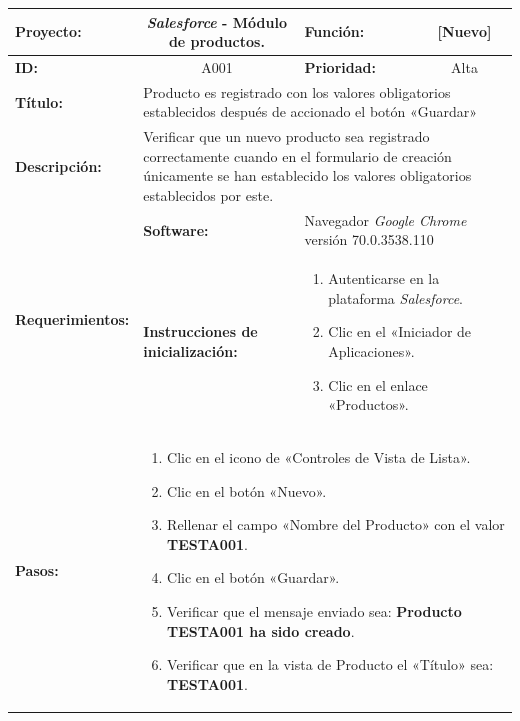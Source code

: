 \begin{table}[H]
\centering
\begin{tabular}{|p{2.5cm}|p{2.8cm}|p{2.2cm}|p{2.8cm}|p{2.2cm}|}
\hline
\footnotesize{\textbf{Proyecto:}} &
\multicolumn{2}{c|}{\footnotesize{\emph{Salesforce} - Módulo de productos.}} &
\footnotesize{\textbf{Función:}} &
\multicolumn{1}{c|}{\footnotesize{[Nuevo]}} \\
\hline
\footnotesize{\textbf{ID:}} & \multicolumn{2}{c|}{\footnotesize{A001}} &
\footnotesize{\textbf{Prioridad:}} &
\multicolumn{1}{c|}{\footnotesize{Alta}} \\
\hline
\footnotesize{\textbf{Título:}} &
\multicolumn{4}{p{12.4cm}|}{\footnotesize{Producto es registrado con los valores
obligatorios establecidos después de accionado el botón «Guardar»}} \\
\hline
\footnotesize{\textbf{Descripción:}} &
\multicolumn{4}{p{12.4cm}|}{\footnotesize{Verificar que un nuevo producto sea
registrado correctamente cuando en el formulario de creación únicamente se han
establecido los valores obligatorios establecidos por este.}} \\
\hline
\multirow{2}{*}{\footnotesize{\textbf{Requerimientos:}}} &
\footnotesize{\textbf{Software:}} &
\multicolumn{3}{p{7.8cm}|}{\footnotesize{Navegador \emph{Google Chrome}
versión 70.0.3538.110}} \\
\cline{2-5}
& \footnotesize{\textbf{Instrucciones de inicialización:}} &
\multicolumn{3}{p{7.8cm}|}{\footnotesize{
\begin{enumerate}
\item Autenticarse en la plataforma \emph{Salesforce}.
\item Clic en el «Iniciador de Aplicaciones».
\item Clic en el enlace «Productos».
\end{enumerate}
}} \\
\hline
\footnotesize{\textbf{Pasos:}} &
\multicolumn{4}{p{11.8cm}|}{\footnotesize{
\begin{enumerate}
\item Clic en el icono de «Controles de Vista de Lista».
\item Clic en el botón «Nuevo».
\item Rellenar el campo «Nombre del Producto» con el valor \textbf{TESTA001}.
\item Clic en el botón «Guardar».
\item Verificar que el mensaje enviado sea: \textbf{Producto TESTA001 ha sido creado}.
\item Verificar que en la vista de Producto el «Título» sea: \textbf{TESTA001}.

\end{enumerate}}}
\end{tabular}
\end{table}

